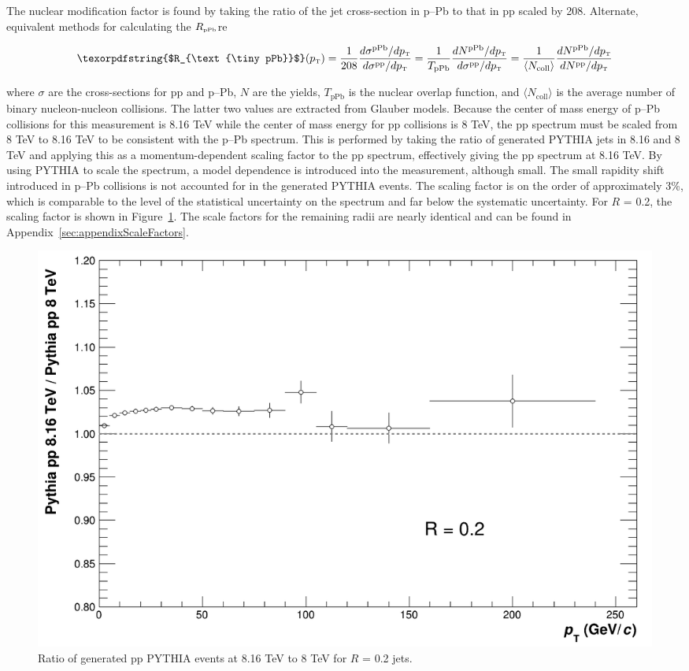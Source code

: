 \documentclass[ALICE]{ALICE_analysis_notes}
\newcommand{\pT}{$p_{\mbox{\tiny T}}$\xspace}
\newcommand{\pPb}{{\mbox{p--Pb}}\xspace}
\newcommand{\pp}{pp\xspace}
\newcommand{\RpPb}{\texorpdfstring{$R_{\text{\tiny pPb}}$}\xspace\xspace}
\begin{document}
The nuclear modification factor is found by taking the ratio of the jet cross-section in \pPb to that in \pp scaled by 208. Alternate, equivalent methods for calculating the \RpPb are 

\begin{equation}
    \text{\RpPb}(\text{\pT}) = \frac{1}{208} \frac{ d\sigma^{\text{pPb}}/d\text{\pT} }{ d\sigma^{\text{\pp}}/d\text{\pT} } = \frac{1}{T_\text{pPb}} \frac{ dN^{\text{pPb}}/d\text{\pT} }{ d\sigma^{\text{\pp}}/d\text{\pT} } = \frac{1}{\langle N_\text{coll}\rangle} \frac{ dN^{\text{pPb}}/d\text{\pT} }{ dN^{\text{\pp}}/d\text{\pT} }
    \label{eq:RpPb_equation}
\end{equation}

\noindent
where $\sigma$ are the cross-sections for \pp and \pPb, $N$ are the yields, $T_{\text{pPb}}$ is the nuclear overlap function, and $\langle N_\text{coll}\rangle$ is the average number of binary nucleon-nucleon collisions. The latter two values are extracted from Glauber models. Because the center of mass energy of \pPb collisions for this measurement is 8.16 TeV while the center of mass energy for \pp collisions is 8 TeV, the \pp spectrum must be scaled from 8 TeV to 8.16 TeV to be consistent with the \pPb spectrum. This is performed by taking the ratio of generated PYTHIA jets in 8.16 and 8 TeV and applying this as a momentum-dependent scaling factor to the \pp spectrum, effectively giving the \pp spectrum at 8.16 TeV. By using PYTHIA to scale the spectrum, a model dependence is introduced into the measurement, although small. The small rapidity shift introduced in \pPb collisions is not accounted for in the generated PYTHIA events. The scaling factor is on the order of approximately 3\%, which is comparable to the level of the statistical uncertainty on the spectrum and far below the systematic uncertainty. For $R$ = 0.2, the scaling factor is shown in Figure~\ref{fig:PythiaScaleFactor}. The scale factors for the remaining radii are nearly identical and can be found in Appendix~\ref{sec:appendixScaleFactors}.

\begin{figure}[hbt!]
    \centering
    \includegraphics[width=\textwidth]{figures/ScaleFactorPythia/PythiaRatio_R02.png}
    \caption{Ratio of generated \pp PYTHIA events at 8.16 TeV to 8 TeV for $R$ = 0.2 jets.}
    \label{fig:PythiaScaleFactor}
\end{figure}
\end{document}
